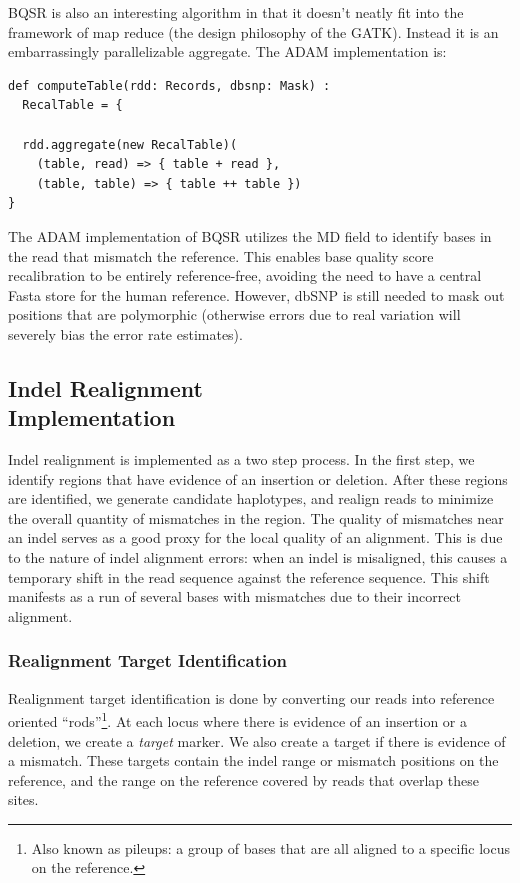 \documentclass{acm_proc_article-sp}
\begin{document}
BQSR is also an interesting algorithm in that it doesn't neatly fit into the framework of map reduce (the design philosophy of the GATK).
Instead it is an embarrassingly parallelizable aggregate. The ADAM implementation is:

\begin{lstlisting}
def computeTable(rdd: Records, dbsnp: Mask) :
  RecalTable = {
  
  rdd.aggregate(new RecalTable)(
    (table, read) => { table + read },
    (table, table) => { table ++ table })
}
\end{lstlisting}

The ADAM implementation of BQSR utilizes the MD field to identify bases in the read that mismatch the reference. This enables
base quality score recalibration to be entirely reference-free, avoiding the need to have a central Fasta store for the human
reference. However, dbSNP is still needed to mask out positions that are polymorphic (otherwise errors due to real variation will
severely bias the error rate estimates).

\subsection{Indel Realignment\\Implementation}
\label{sec:indel-realignment-implementation}

Indel realignment is implemented as a two step process. In the first step, we identify regions that have evidence of an insertion or
deletion. After these regions are identified, we generate candidate haplotypes, and realign reads to minimize the overall quantity
of mismatches in the region. The quality of mismatches near an indel serves as a good proxy for the local quality of an alignment.
This is due to the nature of indel alignment errors: when an indel is misaligned, this causes a temporary shift in the read sequence
against the reference sequence. This shift manifests as a run of several bases with mismatches due to their incorrect alignment.

\subsubsection{Realignment Target Identification}
\label{sec:realignment-target-identification}

Realignment target identification is done by converting our reads into reference oriented ``rods''\footnote{Also known as pileups: a
group of bases that are all aligned to a specific locus on the reference.}. At each locus where there is evidence of an insertion or a
deletion, we create a \emph{target} marker. We also create a target if there is evidence of a mismatch. These targets contain the indel
range or mismatch positions on the reference, and the range on the reference covered by reads that overlap these sites.
\end{document}
